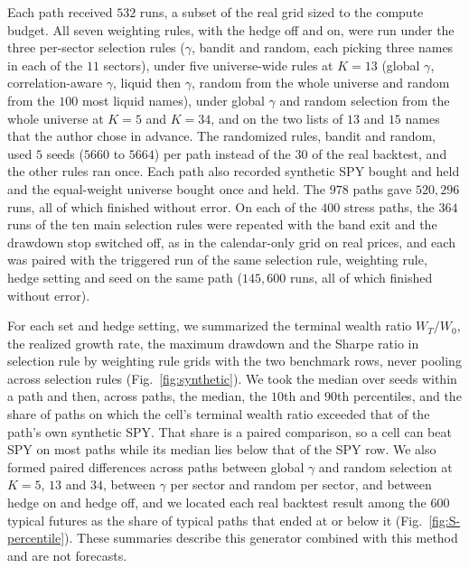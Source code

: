 Each path received $532$ runs, a subset of the real grid sized to the compute budget. All seven weighting rules, with
the hedge off and on, were run under the three per-sector selection rules ($\gamma$, bandit and random, each picking
three names in each of the $11$ sectors), under five universe-wide rules at $K = 13$ (global $\gamma$,
correlation-aware $\gamma$, liquid then $\gamma$, random from the whole universe and random from the $100$ most liquid
names), under global $\gamma$ and random selection from the whole universe at $K = 5$ and $K = 34$, and on the two
lists of $13$ and $15$ names that the author chose in advance. The randomized rules, bandit and random, used $5$ seeds
($5660$ to $5664$) per path instead of the $30$ of the real backtest, and the other rules ran once. Each path also
recorded synthetic SPY bought and held and the equal-weight universe bought once and held. The $978$ paths gave
$520{,}296$ runs, all of which finished without error.
On each of the $400$ stress paths, the $364$ runs of the ten main selection rules were repeated with the band exit
and the drawdown stop switched off, as in the calendar-only grid on real prices, and each was paired with the
triggered run of the same selection rule, weighting rule, hedge setting and seed on the same path ($145{,}600$ runs,
all of which finished without error).

For each set and hedge setting, we summarized the terminal wealth ratio $W_T/W_0$, the realized growth rate, the
maximum drawdown and the Sharpe ratio in selection rule by weighting rule grids with the two benchmark rows, never
pooling across selection rules (Fig.~\ref{fig:synthetic}). We took the median over seeds within a path and then,
across paths, the median, the $10$th and $90$th percentiles, and the share of paths on which the cell's terminal
wealth ratio exceeded that of the path's own synthetic SPY. That share is a paired comparison, so a cell can beat SPY
on most paths while its median lies below that of the SPY row. We also formed paired differences across paths between
global $\gamma$ and random selection at $K = 5$, $13$ and $34$, between $\gamma$ per sector and random per sector, and
between hedge on and hedge off, and we located each real backtest result among the $600$ typical futures as the share
of typical paths that ended at or below it (Fig.~\ref{fig:S-percentile}). These summaries describe this generator
combined with this method and are not forecasts.

